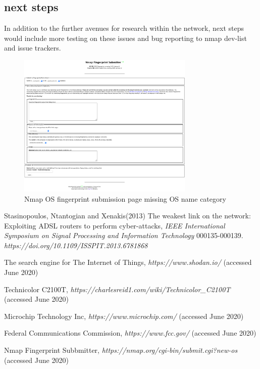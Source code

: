 \documentclass[10pt]{article}
\begin{document}
\medskip

\subsection*{next steps}
In addition to the further avenues for research within the network, next steps would include more testing on these issues and bug reporting to nmap dev-list and issue
trackers.

\begin{figure}[H]
\centering
\includegraphics[width=0.75\textwidth]{bug.png}
\caption{Nmap OS fingerprint submission page missing OS name category}\label{bug image}
\end{figure}

\begin{thebibliography}{9} 

 Stasinopoulos, Ntantogian and  Xenakis(2013) The weakest link on the network: Exploiting ADSL routers to perform cyber-attacks, \textit{IEEE International Symposium on Signal Processing and Information Technology} 000135-000139. \textit {https://doi.org/10.1109/ISSPIT.2013.6781868}

 The search engine for The Internet of Things, \textit{https://www.shodan.io/} (accessed June 2020)

 Technicolor C2100T, \textit{https://charlesreid1.com/wiki/Technicolor\_C2100T} (accessed June 2020)

 Microchip Technology Inc, \textit{https://www.microchip.com/} (accessed June 2020)

 Federal Communications Commission, \textit{https://www.fcc.gov/} (accessed June 2020)

 Nmap Fingerprint Subbmitter, \textit{https://nmap.org/cgi-bin/submit.cgi?new-os} (accessed June 2020)

\end{thebibliography}
\end{document}
